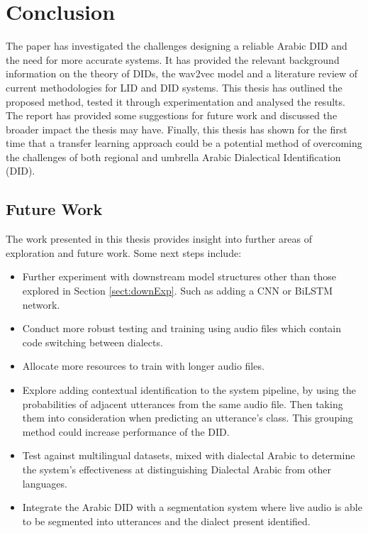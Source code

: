 \chapter{Conclusion}\label{ch:conclusion}
The paper has investigated the challenges designing a reliable Arabic DID and the need for 
more accurate systems. It has provided the relevant background information on the theory of DIDs, the wav2vec model and a literature review of current methodologies for LID and DID
systems. This thesis has outlined the proposed method, tested it through experimentation and analysed the results. The report has provided some suggestions for 
future work and discussed the broader impact the thesis may have. Finally, this thesis has shown for the first time that a transfer learning approach could be a potential method of overcoming the challenges of both regional and umbrella Arabic Dialectical Identification (DID). 

\section{Future Work}\label{sect:futwrk}

The work presented in this thesis provides insight into further areas of exploration and future work. Some next steps include: 
\begin{itemize}
    \item Further experiment with downstream model structures other than those explored in Section \ref{sect:downExp}. Such as adding a CNN or BiLSTM network. 
    \item Conduct more robust testing and training using audio files which contain code switching between dialects. 
    \item Allocate more resources to train with longer audio files. 
    \item Explore adding contextual identification to the system pipeline, by using the probabilities of adjacent utterances from the same audio file. Then taking them into consideration when predicting an utterance's class. This grouping method could increase performance of the DID. 
    \item Test against multilingual datasets, mixed with dialectal Arabic to determine the system's effectiveness at distinguishing Dialectal Arabic from other languages.
    \item Integrate the Arabic DID with a segmentation system where live audio is able to be segmented into utterances and the dialect present identified. 
\end{itemize}

